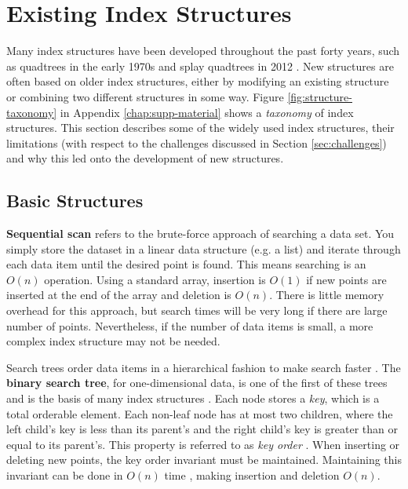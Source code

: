 \section{Existing Index Structures}
\label{sec:structures}

Many index structures have been developed throughout the past forty years, such as quadtrees in the early 1970s \cite{quadtree} and splay quadtrees in 2012 \cite{splay-quadtree}. New structures are often based on older index structures, either by modifying an existing structure or combining two different structures in some way. Figure \ref{fig:structure-taxonomy} in Appendix \ref{chap:supp-material} shows a \textit{taxonomy} of index structures. This section describes some of the widely used index structures, their limitations (with respect to the challenges discussed in Section \ref{sec:challenges}) and why this led onto the development of new structures.

\subsection{Basic Structures}
\label{sec:basic-structures}

\textbf{Sequential scan} refers to the brute-force approach of searching a data set. You simply store the dataset in a linear data structure (e.g. a list) and iterate through each data item until the desired point is found. This means searching is an $O(n)$ operation. Using a standard array, insertion is $O(1)$ if new points are inserted at the end of the array and deletion is $O(n)$. There is little memory overhead for this approach, but search times will be very long if there are large number of points. Nevertheless, if the number of data items is small, a more complex index structure may not be needed.

Search trees order data items in a hierarchical fashion to make search faster \cite{introduction-to-algorithms}. The \textbf{binary search tree}, for one-dimensional data, is one of the first of these trees and is the basis of many index structures \cite{introduction-to-algorithms}. Each node stores a \textit{key}, which is a total orderable element. Each non-leaf node has at most two children, where the left child's key is less than its parent's and the right child's key is greater than or equal to its parent's. This property is referred to as \textit{key order} \cite{rst}. When inserting or deleting new points, the key order invariant must be maintained. Maintaining this invariant can be done in $O(n)$ time \cite{introduction-to-algorithms}, making insertion and deletion $O(n)$.

